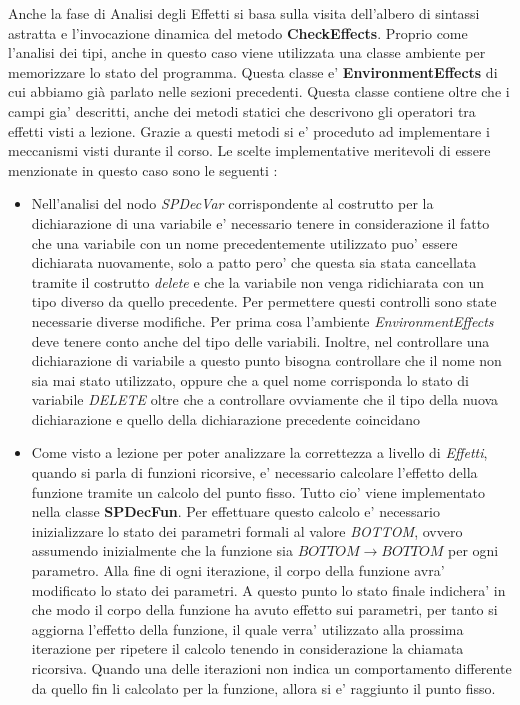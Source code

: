 \documentclass{article}
\begin{document}
Anche la fase di Analisi degli Effetti si basa sulla visita dell'albero di sintassi astratta e l'invocazione dinamica del metodo \textbf{CheckEffects}. Proprio come l'analisi dei tipi, anche in questo caso viene utilizzata una classe ambiente per memorizzare lo stato del programma. Questa classe e' \textbf{EnvironmentEffects} di cui abbiamo già parlato nelle sezioni precedenti. Questa classe contiene oltre che i campi gia' descritti, anche dei metodi statici che descrivono gli operatori tra effetti visti a lezione. Grazie a questi metodi si e' proceduto ad implementare i meccanismi visti durante il corso. Le scelte implementative meritevoli di essere menzionate in questo caso sono le seguenti : \\
\begin{itemize}
    \item Nell'analisi del nodo \textit{SPDecVar} corrispondente al costrutto per la dichiarazione di una variabile e' necessario tenere in considerazione il fatto che una variabile con un nome precedentemente utilizzato puo' essere dichiarata nuovamente, solo a patto pero' che questa sia stata cancellata tramite il costrutto \textit{delete} e che la variabile non venga ridichiarata con un tipo diverso da quello precedente. Per permettere questi controlli sono state necessarie diverse modifiche. Per prima cosa l'ambiente \textit{EnvironmentEffects} deve tenere conto anche del tipo delle variabili. Inoltre, nel controllare una dichiarazione di variabile a questo punto bisogna controllare che il nome non sia mai stato utilizzato, oppure che a quel nome corrisponda lo stato di variabile \textit{DELETE} oltre che a controllare ovviamente che il tipo della nuova dichiarazione e quello della dichiarazione precedente coincidano
    \item Come visto a lezione per poter analizzare la correttezza a livello di \textit{Effetti}, quando si parla di funzioni ricorsive, e' necessario calcolare l'effetto della funzione tramite un calcolo del punto fisso. Tutto cio' viene implementato nella classe \textbf{SPDecFun}. Per effettuare questo calcolo e' necessario inizializzare lo stato dei parametri formali al valore \textit{BOTTOM}, ovvero assumendo inizialmente che la funzione sia 
    $BOTTOM \rightarrow BOTTOM$ per ogni parametro. Alla fine di ogni iterazione, il corpo della funzione avra' modificato lo stato dei parametri. A questo punto lo stato finale indichera' in che modo il corpo della funzione ha avuto effetto sui parametri, per tanto si aggiorna l'effetto della funzione, il quale verra' utilizzato alla prossima iterazione per ripetere il calcolo tenendo in considerazione la chiamata ricorsiva. Quando una delle iterazioni non indica un comportamento differente da quello fin li calcolato per la funzione, allora si e' raggiunto il punto fisso. \\ 

\end{itemize}
\end{document}
